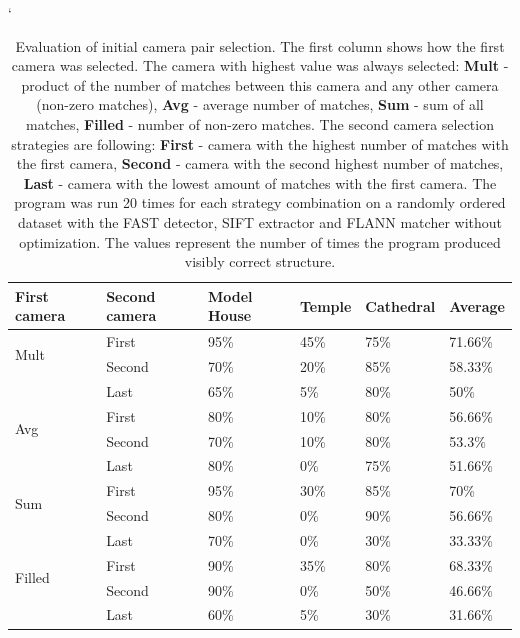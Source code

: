 \begin{table}[!htbp]
	\catcode`
	\begin{center}
		\begin{tabular}{| l | l | l | l | l | l |}
			\hline 
			\textbf{First camera} & 
			\textbf{Second camera} & 
			\textbf{Model House} & 
			\textbf{Temple}  & 
			\textbf{Cathedral}  & 
			\textbf{Average} \\ \hline 
			\multirow{2}{*}{Mult}		& First			& 95\%	& 45\% & 75\%		& 71.66\% \\ \cline{2-6}
													& Second		& 70\%	& 20\%	& 85\%		& 58.33\%	\\ \cline{2-6}
													& Last			& 65\% & 5\%	& 80\%		& 50\%	 \\ \hline
			\multirow{2}{*}{Avg}			& First			& 80\%	& 10\% & 80\%		& 56.66\%	 \\ \cline{2-6}
													& Second		& 70\%	& 10\% & 80\%		& 53.3\%	 \\ \cline{2-6}
													& Last			& 80\% & 0\%	& 75\%		& 51.66\%	 \\ \hline
			\multirow{2}{*}{Sum}		& First			& 95\%	& 30\% & 85\%		& 70\%	 \\ \cline{2-6}
													& Second		& 80\%	& 0\%	& 90\%		& 56.66\%	 \\ \cline{2-6}
													& Last			& 70\% & 0\%	& 30\%		& 33.33\%	 \\ \hline
			\multirow{2}{*}{Filled}		& First			& 90\%	& 35\%	& 80\% 	& 68.33\%	 \\ \cline{2-6}
													& Second		& 90\%	& 0\%	& 50\% 	& 46.66\%	 \\ \cline{2-6}
													& Last			& 60\% & 5\%	& 30\%		& 31.66\%	 \\ \hline
		\end{tabular}
		\caption{Evaluation of initial camera pair selection. The first column shows how the first camera was selected. The camera with highest value was always selected: \textbf{Mult} - product of the number of matches between this camera and any other camera (non-zero matches), \textbf{Avg} - average number of matches, \textbf{Sum} - sum of all matches, \textbf{Filled} - number of non-zero matches. The second camera selection strategies are following: \textbf{First} - camera with the highest number of matches with the first camera, \textbf{Second} - camera with the second highest number of matches, \textbf{Last} - camera with the lowest amount of matches with the first camera. The program was run 20 times for each strategy combination on a randomly ordered dataset with the FAST detector, SIFT extractor and FLANN matcher without optimization. The values represent the number of times the program produced visibly correct structure.}
		\label{tab:matches}
	\end{center}
\end{table}

